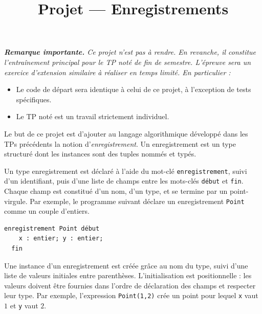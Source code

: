 \documentclass[livret]{td}
\title{Projet --- Enregistrements}
\begin{document}
\maketitle

\vspace{-5mm}

\begin{center}
  \begin{minipage}{.9\textwidth}
    \it
    \textbf{Remarque importante.} Ce projet n'est pas à rendre. En revanche, il constitue l'entraînement principal pour le TP noté de fin de semestre.
    L'épreuve sera un exercice d'extension similaire à réaliser en temps limité. En particulier :
    \begin{itemize}
    \item Le code de départ sera identique à celui de ce projet, à l'exception de tests spécifiques.
    \item Le TP noté est un travail strictement individuel.
    \end{itemize}
  \end{minipage}
\end{center}

\vspace{3mm}

Le but de ce projet est d'ajouter au langage algorithmique développé dans les TPs précédents la notion d'\emph{enregistrement}.
Un enregistrement est un type structuré dont les instances sont des tuples nommés et typés.

Un type enregistrement est déclaré à l'aide du mot-clé \lstinline|enregistrement|, suivi d'un identifiant,
puis d'une liste de champs entre les mots-clés \lstinline|début| et \lstinline|fin|.
Chaque champ est constitué d'un nom, d'un type, et se termine par un point-virgule. Par exemple, le programme suivant déclare un enregistrement
\lstinline{Point} comme un couple d'entiers. 

\begin{lstlisting}[gobble=2]
  enregistrement Point début
    x : entier; y : entier;
  fin
\end{lstlisting}

Une instance d'un enregistrement est créée grâce au nom du type, suivi d'une liste de valeurs initiales entre parenthèses.
L'initialisation est positionnelle : les valeurs doivent être fournies dans l'ordre de déclaration des champs et respecter leur type.
Par exemple, l'expression \lstinline{Point(1,2)} crée un point pour lequel \lstinline{x} vaut $1$ et \lstinline{y} vaut $2$.
\end{document}
